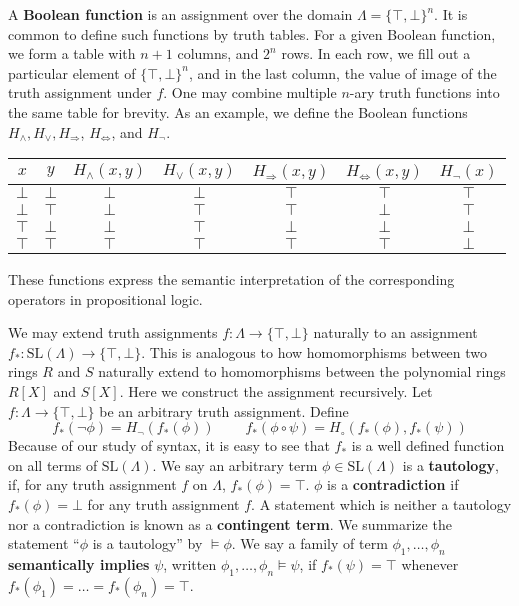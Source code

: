 \begin{example}
    A {\bf Boolean function} is an assignment over the domain $\Lambda = \{ \top, \bot \}^n$. It is common to define such functions by truth tables. For a given Boolean function, we form a table with $n + 1$ columns, and $2^{n}$ rows. In each row, we fill out a particular element of $\{ \top, \bot \}^n$, and in the last column, the value of image of the truth assignment under $f$. One may combine multiple $n$-ary truth functions into the same table for brevity. As an example, we define the Boolean functions $H_\wedge, H_\vee, H_\Rightarrow$, $H_{\Leftrightarrow}$, and $H_\neg$.
    \begin{center}
    \begin{tabular}{| c | c | c | c | c | c | c |}
        \hline $x$ & $y$ & $H_\wedge(x,y)$ & $H_\vee(x,y)$ & $H_\Rightarrow(x,y)$ & $H_\Leftrightarrow(x,y)$ & $H_\neg(x)$ \\
        \hline $\bot$ & $\bot$ & $\bot$ & $\bot$ & $\top$ & $\top$ & $\top$ \\
        $\bot$ & $\top$ & $\bot$ & $\top$ & $\top$ & $\bot$ & $\top$ \\
        $\top$ & $\bot$ & $\bot$ & $\top$ & $\bot$ & $\bot$ & $\bot$ \\
        $\top$ & $\top$ & $\top$ & $\top$ & $\top$ & $\top$ & $\bot$ \\
        \hline
    \end{tabular}
    \end{center}
    These functions express the semantic interpretation of the corresponding operators in propositional logic.
\end{example}

We may extend truth assignments $f: \Lambda \to \{ \top, \bot \}$ naturally to an assignment $f_*: \text{SL}(\Lambda) \to \{ \top, \bot \}$. This is analogous to how homomorphisms between two rings $R$ and $S$ naturally extend to homomorphisms between the polynomial rings $R[X]$ and $S[X]$. Here we construct the assignment recursively. Let $f: \Lambda \to \{ \top, \bot \}$ be an arbitrary truth assignment. Define
%
\[ f_*(\neg \phi) = H_\neg(f_*(\phi))\ \ \ \ \ \ \ \ \ \ f_*(\phi \circ \psi) = H_\circ(f_*(\phi), f_*(\psi)) \]
%
Because of our study of syntax, it is easy to see that $f_*$ is a well defined function on all terms of $\text{SL}(\Lambda)$. We say an arbitrary term $\phi \in \text{SL}(\Lambda)$ is a {\bf tautology}, if, for any truth assignment $f$ on $\Lambda$, $f_*(\phi) = \top$. $\phi$ is a {\bf contradiction} if $f_*(\phi) = \bot$ for any truth assignment $f$. A statement which is neither a tautology nor a contradiction is known as a {\bf contingent term}. We summarize the statement ``$\phi$ is a tautology'' by $\vDash \phi$. We say a family of term $\phi_1, \dots, \phi_n$ {\bf semantically implies} $\psi$, written $\phi_1, \dots, \phi_n \vDash \psi$, if $f_*(\psi) = \top$ whenever $f_*(\phi_1) = \dots = f_*(\phi_n) = \top$.

